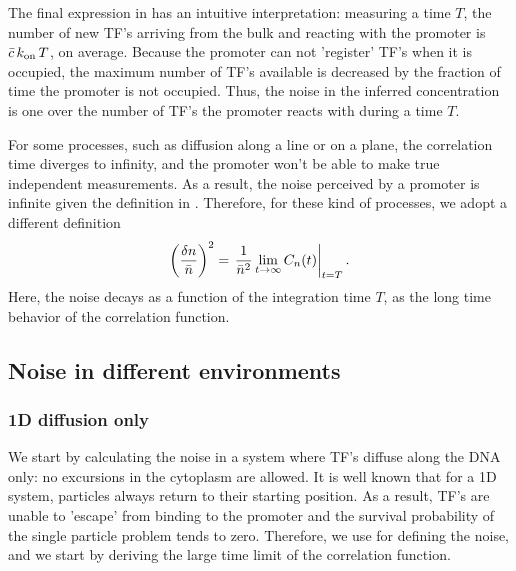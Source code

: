 The final expression in  has an intuitive interpretation: measuring a time $T$, the number of new TF's arriving from the bulk and reacting with the promoter is $\bar{c}\,k_{\rm on}\,T$, on average.  Because the promoter can not 'register' TF's when it is occupied, the maximum number of TF's available is decreased by the fraction of time the promoter is not occupied. Thus, the noise in the inferred concentration is one over the number of TF's the promoter reacts with during a time $T$.

For some processes, such as diffusion along a line or on a plane, the correlation time diverges to infinity, and the promoter won't be able to make true independent measurements. As a result, the noise perceived by a promoter is infinite given the definition in . Therefore, for these kind of processes, we adopt a different definition
\begin{equation}
  \left( \frac{\delta n}{\bar{n}} \right)^2 = \left. \frac{1}{\bar{n}^2} \lim_{t \to \infty} C_n(t)  \right|_{t = T}.
  \elabel{EqProNoiseII}
\end{equation}
Here, the noise decays as a function of the integration time $T$, as the long time behavior of the correlation function.


\subsection{Noise in different environments}

\subsubsection{1D diffusion only}
We start by calculating the noise in a system where TF's diffuse along the DNA only: no excursions in the cytoplasm are allowed. It is well known \cite{Redner2001} that for a 1D system, particles always return to their starting position. As a result, TF's are unable to 'escape' from binding to the promoter and the survival probability of the single particle problem tends to zero. Therefore, we use  for defining the noise, and we start by deriving the large time limit of the correlation function.

